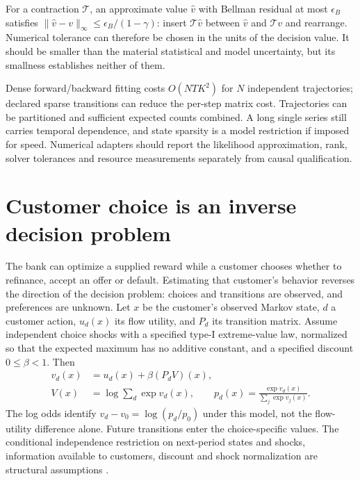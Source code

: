 For a contraction $\mathcal T$, an approximate value $\widehat v$
with Bellman residual at most $\epsilon_B$ satisfies
$\|\widehat v-v\|_\infty\le\epsilon_B/(1-\gamma)$: insert
$\mathcal T\widehat v$ between $\widehat v$ and $\mathcal Tv$
and rearrange. Numerical tolerance can therefore be chosen in the
units of the decision value. It should be smaller than the material
statistical and model uncertainty, but its smallness establishes
neither of them.

Dense forward/backward fitting costs $O(NTK^2)$ for $N$ independent
trajectories; declared sparse transitions can reduce the per-step
matrix cost. Trajectories can be partitioned and sufficient expected
counts combined. A long single series still carries temporal dependence,
and state sparsity is a model restriction if imposed for speed.
Numerical adapters should report the likelihood approximation, rank,
solver tolerances and resource measurements separately from causal
qualification.





\section{Customer choice is an inverse decision problem}
\label{r3:customer-choice}
The bank can optimize a supplied reward while a customer chooses
whether to refinance, accept an offer or default. Estimating that
customer's behavior reverses the direction of the decision problem:
choices and transitions are observed, and preferences are unknown.
Let $x$ be the customer's observed Markov state, $d$ a customer
action, $u_d(x)$ its flow utility, and $P_d$ its transition matrix.
Assume independent choice shocks with a specified type-I extreme-value
law, normalized so that the expected maximum has no additive constant,
and a specified discount $0\le\beta<1$. Then
\begin{align}
 v_d(x)&=u_d(x)+\beta(P_dV)(x),\nonumber\\
 V(x)&=\log\sum_d\exp v_d(x),\qquad
 p_d(x)=\frac{\exp v_d(x)}{\sum_j\exp v_j(x)}.
 \label{r3:ddc-logit}
\end{align}
The log odds identify $v_d-v_0=\log(p_d/p_0)$ under this model,
not the flow-utility difference alone. Future transitions enter the
choice-specific values. The conditional independence restriction on
next-period states and shocks, information available to customers,
discount and shock normalization are structural assumptions
\citep[Section 2]{kalouptsidi2021}.

